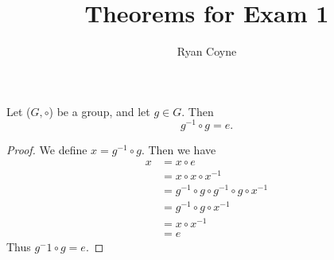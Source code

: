 \documentclass[12pt]{article}
\title{Theorems for Exam 1}
\author{Ryan Coyne}
\begin{document}
\maketitle

\setlength{\parindent}{0pt}

\begin{theorem}
    Let (\(G, \circ\)) be a group, and let \(g\in G\). Then
    \begin{equation*}
        g^{-1} \circ g = e.
    \end{equation*}
\end{theorem}

\begin{proof}
    We define \(x = g^{-1}\circ g\). Then we have
    \begin{equation*}
        \begin{split}
            x &= x\circ e\\
            & = x \circ x \circ x^{-1}\\
            &= g^{-1} \circ g \circ g^{-1} \circ g \circ x^{-1}\\
            &= g^{-1} \circ g \circ x^{-1}\\
            &= x \circ x^{-1}\\
            &= e
        \end{split}
    \end{equation*}
    Thus \(g^-1\circ g = e\).
\end{proof}
\end{document}
